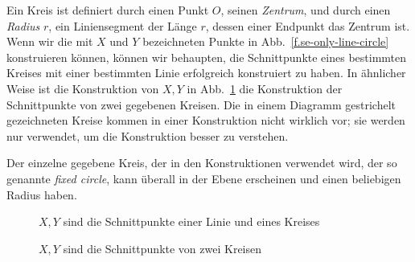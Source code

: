 Ein Kreis ist definiert durch einen Punkt $O$, seinen \emph{Zentrum}, und durch einen \emph{Radius} $r$, ein Liniensegment der Länge $r$, dessen einer Endpunkt das Zentrum ist. Wenn wir die mit $X$ und $Y$ bezeichneten Punkte in Abb.~\ref{f.se-only-line-circle} konstruieren können, können wir behaupten, die Schnittpunkte eines bestimmten Kreises mit einer bestimmten Linie erfolgreich konstruiert zu haben. In ähnlicher Weise ist die Konstruktion von $X,Y$ in Abb.~\ref{f.se-only-two-circles} die Konstruktion der Schnittpunkte von zwei gegebenen Kreisen. Die in einem Diagramm gestrichelt gezeichneten Kreise kommen in einer Konstruktion nicht wirklich vor; sie werden nur verwendet, um die Konstruktion besser zu verstehen.

Der einzelne gegebene Kreis, der in den Konstruktionen verwendet wird, der so genannte \emph{fixed circle}, kann überall in der Ebene erscheinen und einen beliebigen Radius haben.

\begin{figure}[t]
\begin{minipage}{.45\textwidth}
\caption{$X,Y$ sind die Schnittpunkte einer Linie und eines Kreises}\label{f.se-only-line-circle}
\end{minipage}
\hfill
\begin{minipage}{.45\textwidth}
\caption{$X,Y$ sind die Schnittpunkte von zwei Kreisen}\label{f.se-only-two-circles}
\end{minipage}
\end{figure}

